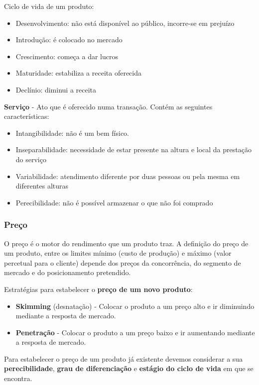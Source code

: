 \documentclass[11pt]{article}
\begin{document}
Ciclo de vida de um produto:
\begin{itemize}[topsep=0pt]
    \item Desenvolvimento: não está disponível ao público, incorre-se em prejuízo
    \item Introdução: é colocado no mercado
    \item Crescimento: começa a dar lucros
    \item Maturidade: estabiliza a receita oferecida
    \item Declínio: diminui a receita
\end{itemize}


\textbf{Serviço} - Ato que é oferecido numa transação. Contém as seguintes características:
\begin{itemize}[topsep=0pt]
    \item Intangibilidade: não é um bem físico.
    \item Inseparabilidade: necessidade de estar presente na altura e local da prestação do serviço
    \item Variabilidade: atendimento diferente por duas pessoas ou pela mesma em
          diferentes alturas
    \item Perecibilidade: não é possível armazenar o que não foi comprado
\end{itemize}

\subsubsection{Preço}

O preço é o motor do rendimento que um produto traz. A definição do preço de um produto, entre os limites mínimo (custo de produção) e máximo (valor percetual para o cliente) depende dos preços da concorrência, do segmento de mercado e do posicionamento pretendido.

Estratégias para estabelecer o \textbf{preço de um novo produto}:
\begin{itemize}[topsep=0pt]
    \item \textbf{Skimming} (desnatação) - Colocar o produto a um preço alto e ir diminuindo mediante a resposta de mercado.
    \item \textbf{Penetração} - Colocar o produto a um preço baixo e ir aumentando mediante a resposta de mercado.
\end{itemize}

Para estabelecer o preço de um produto já existente devemos considerar a sua \textbf{perecibilidade}, \textbf{grau de diferenciação} e \textbf{estágio do ciclo de vida} em que se encontra.
\end{document}
